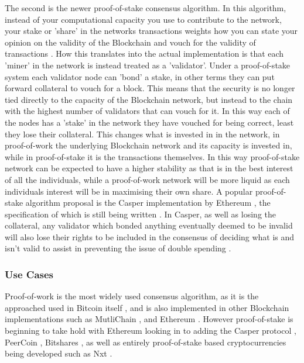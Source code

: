 \documentclass{article}
\begin{document}
The second is the newer proof-of-stake consensus algorithm. In this algorithm, instead of your computational capacity you use to contribute to the network, your stake or 'share' in the networks transactions weights how you can state your opinion on the validity of the Blockchain and vouch for the validity of transactions \parencite{ProofofS99:online}. How this translates into the actual implementation is that each 'miner' in the network is instead treated as a 'validator'. Under a proof-of-stake system each validator node can 'bond' a stake, in other terms they can put forward collateral to vouch for a block. This means that the security is no longer tied directly to the capacity of the Blockchain network, but instead to the chain with the highest number of validators that can vouch for it. In this way each of the nodes has a 'stake' in the network they have vouched for being correct, least they lose their collateral. This changes what is invested in in the network, in proof-of-work the underlying Blockchain network and its capacity is invested in, while in proof-of-stake it is the transactions themselves. In this way proof-of-stake network can be expected to have a higher stability as that is in the best interest of all the individuals, while a proof-of-work network will be more liquid as each individuals interest will be in maximising their own share. A popular proof-of-stake algorithm proposal is the Casper implementation by Ethereum \parencite{friendlyghost}, the specification of which is still being written \parencite{caspaspecnotes}. In Casper, as well as losing the collateral, any validator which bonded anything eventually deemed to be invalid will also lose their rights to be included in the consensus of deciding what is and isn't valid to assist in preventing the issue of double spending \parencite{caspaspecnotes}.

\subsubsection{Use Cases}

Proof-of-work is the most widely used consensus algorithm, as it is the approached used in Bitcoin itself \parencite{nakamoto2008bitcoin}, and is also implemented in other Blockchain implementations such as MutliChain \parencite{MultiCha46:online}, and Ethereum \parencite{WhitePap68:online}. However proof-of-stake is beginning to take hold with Ethereum looking in to adding the Casper protocol \parencite{friendlyghost}, PeerCoin \parencite{WhitepapPPCoin:online}, Bitshares \parencite{WhitepapBitshares:online}, as well as entirely proof-of-stake based cryptocurrencies being developed such as Nxt \parencite{WhitepapNxt:online}.
\end{document}
